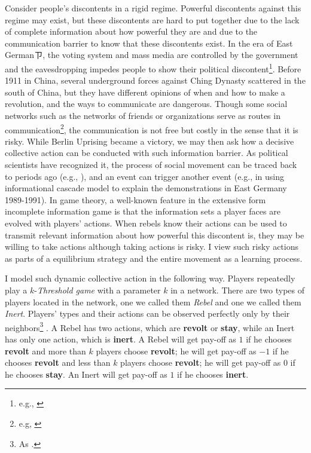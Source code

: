 \documentclass[12pt,letter]{article}
\theoremstyle{definition}
\theoremstyle{remark}
\theoremstyle{claim}
\begin{document}
Consider people's discontents in a rigid regime. Powerful discontents against this regime may exist, but these discontents are hard to put together due to the lack of complete information about how powerful they are and due to the communication barrier to know that these discontents exist. In the era of East Germanㄗ, the voting system and mass media are controlled by the government and the eavesdropping impedes people to show their political discontent\footnote{e.g., \citep{Lohmann2011}}. Before 1911 in China, several underground forces against Ching Dynasty scattered in the south of China, but they have different opinions of when and how to make a revolution, and the ways to communicate are dangerous. Though some social networks such as the networks of friends or organizations serve as routes in communication\footnote{e.g, \citep{Karl-Dieter1993}}, the communication is not free but costly in the sense that it is risky. While Berlin Uprising became a victory, we may then ask how a decisive collective action can be conducted with such information barrier. As political scientists have recognized it, the process of social movement can be traced back to periods ago (e.g., \citep{McAdamDoung;TarrowSidney;Tilly2001} \citep{McAdam2003}), and an event can trigger another event (e.g., \citep{Lohmann2011} in using informational cascade model to explain the demonstrations in East Germany 1989-1991). In game theory, a well-known feature in the extensive form incomplete information game is that the information sets a player faces are evolved with players' actions. When rebels know their actions can be used to transmit relevant information about how powerful this discontent is, they may be willing to take actions although taking actions is risky. I view such risky actions as parts of a equilibrium strategy and the entire movement as a learning process. 

I model such dynamic collective action in the following way. Players repeatedly play a $k$-\textit{Threshold game} with a parameter $k$ in a network. There are two types of players located in the network, one we called them \textit{Rebel} and one we called them \textit{Inert}.  Players' types and their actions can be observed {perfectly only} by their neighbors\footnote{As \citep{chwe2000}.} . A Rebel has two actions, which are \textbf{revolt} or \textbf{stay}, while an Inert has only one action, which is \textbf{inert}. A Rebel will get pay-off as $1$ if he chooses \textbf{revolt} and more than $k$ players choose \textbf{revolt}; he will get pay-off as $-1$ if he chooses \textbf{revolt} and less than $k$ players choose \textbf{revolt}; he will get pay-off as $0$ if he chooses \textbf{stay}. An Inert will get pay-off as $1$ if he chooses \textbf{inert}.
\end{document}
